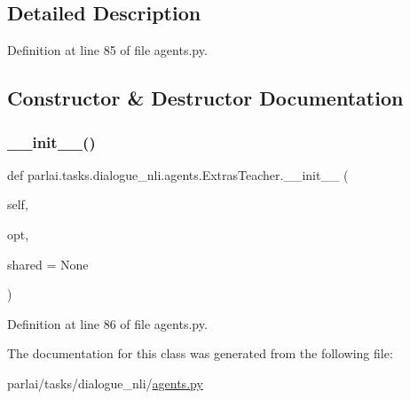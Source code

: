 \subsection{Detailed Description}


Definition at line 85 of file agents.\+py.



\subsection{Constructor \& Destructor Documentation}
\mbox{\label{classparlai_1_1tasks_1_1dialogue__nli_1_1agents_1_1ExtrasTeacher_a5713e0c8aa5f0dc996004e7028c7725b}} 
\subsubsection{\texorpdfstring{\+\_\+\+\_\+init\+\_\+\+\_\+()}{\_\_init\_\_()}}
{\footnotesize\ttfamily def parlai.\+tasks.\+dialogue\+\_\+nli.\+agents.\+Extras\+Teacher.\+\_\+\+\_\+init\+\_\+\+\_\+ (\begin{DoxyParamCaption}\item[{}]{self,  }\item[{}]{opt,  }\item[{}]{shared = {\ttfamily None} }\end{DoxyParamCaption})}



Definition at line 86 of file agents.\+py.



The documentation for this class was generated from the following file\+:\begin{DoxyCompactItemize}
\item 
parlai/tasks/dialogue\+\_\+nli/\hyperlink{parlai_2tasks_2dialogue__nli_2agents_8py}{agents.\+py}\end{DoxyCompactItemize}
